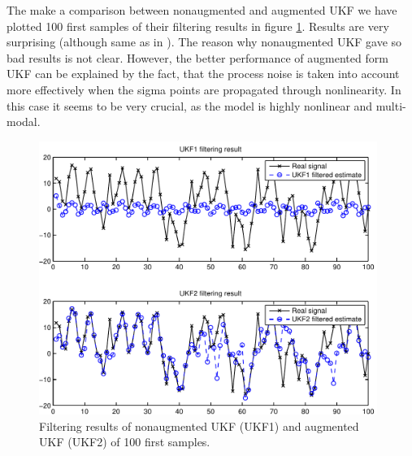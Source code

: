 The make a comparison between nonaugmented and augmented UKF we have
plotted 100 first samples of their filtering results in figure
\ref{fig:ungm_ukf_comp}. Results are very surprising (although same as
in \citet{Wu+Hu+Wu+Hu:2005}). The reason why nonaugmented UKF gave so bad
results is not clear. However, the better performance of augmented
form UKF can be explained by the fact, that the process noise is taken
into account more effectively when the sigma points are propagated
through nonlinearity. In this case it seems to be very crucial, as the
model is highly nonlinear and multi-modal.

\begin{figure}
\begin{center}
\includegraphics[width=11cm]{pics/ungm_ukf_comp}
\caption{Filtering results of nonaugmented UKF (UKF1) and augmented
UKF (UKF2) of 100 first samples.}
\label{fig:ungm_ukf_comp}
\end{center}
\end{figure}

